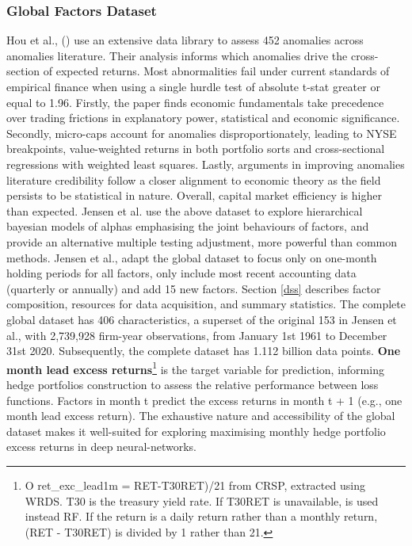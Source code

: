 \documentclass[12pt]{article}
\begin{document}
\subsubsection{Global Factors Dataset}
Hou et al., (\citeyear{hou2020replicating}) use an extensive data library to assess 452 anomalies across anomalies literature.
Their analysis informs which anomalies drive the cross-section of expected returns.
Most abnormalities fail under current standards of empirical finance when using a single hurdle test of absolute t-stat greater or equal to 1.96.
Firstly, the paper finds economic fundamentals take precedence over trading frictions in explanatory power, statistical and economic significance.
Secondly, micro-caps account for anomalies disproportionately, leading to NYSE breakpoints, value-weighted returns in both portfolio sorts and cross-sectional regressions with weighted least squares.
Lastly, arguments in improving anomalies literature credibility follow a closer alignment to economic theory as the field persists to be statistical in nature.
Overall, capital market efficiency is higher than expected.
Jensen et al. \citeyear{jensen2021there} use the above dataset to explore hierarchical bayesian models of alphas emphasising the joint behaviours of factors,
and provide an alternative multiple testing adjustment, more powerful than common methods.
Jensen et al., adapt the global dataset to focus only on one-month holding periods for all factors, only include most recent accounting data (quarterly or annually) and add 15 new factors.
Section \ref{dss} describes factor composition, resources for data acquisition, and summary statistics.
The complete global dataset has 406 characteristics, a superset of the original 153 in Jensen et al., with 2,739,928 firm-year observations, from January 1st 1961 to December 31st 2020.
Subsequently, the complete dataset has 1.112 billion data points. \textbf{One month lead excess returns}\footnote{O ret\_exc\_lead1m = RET-T30RET)/21 from CRSP, extracted using WRDS. T30 is the treasury yield rate.
	If T30RET is unavailable, is used instead RF. If the return is a daily return rather than a monthly return, (RET - T30RET) is divided by 1 rather than 21.}
is the target variable for prediction, informing hedge portfolios construction to
assess the relative performance between loss functions.
Factors in month t predict the excess returns in month t + 1 (e.g., one month lead excess return).
The exhaustive nature and accessibility of the global dataset makes it well-suited for exploring maximising monthly hedge portfolio excess returns in deep neural-networks.
\end{document}
